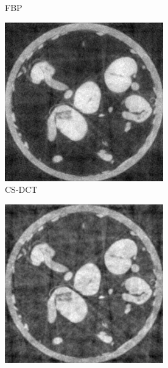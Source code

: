 \documentclass{article}
\begin{document}
\begin{figure}[h]
\begin{subfigure}[b]{0.3\linewidth}
        \caption{FBP}
    \end{subfigure}
    \begin{subfigure}[b]{0.3\linewidth}
        \includegraphics[width=\textwidth]{../images/supplementary/2D_sprouts/92_angles/1/cs_dct.png}
        \caption{CS-DCT}
     \end{subfigure}
    \begin{subfigure}[b]{0.3\linewidth}
        \includegraphics[width=\textwidth]{../images/supplementary/2D_sprouts/92_angles/1/cs_wavelet.png}

\end{subfigure}
\end{figure}
\end{document}

